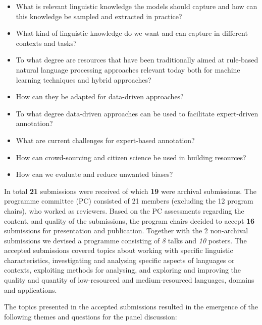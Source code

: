 \begin{itemize}
    \item What is relevant linguistic knowledge the models should capture and how can this knowledge be sampled and extracted in practice?
    \item What kind of linguistic knowledge do we want and can capture in different contexts and tasks?
    \item To what degree are resources that have been traditionally aimed at rule-based natural language processing approaches relevant today both for machine learning techniques and hybrid approaches?
    \item How can they be adapted for data-driven approaches?
    \item To what degree data-driven approaches can be used to facilitate expert-driven annotation?
    \item What are current challenges for expert-based annotation?
    \item How can crowd-sourcing and citizen science be used in building resources?
    \item How can we evaluate and reduce unwanted biases?
\end{itemize}

In total \textbf{21} submissions were received of which \textbf{19} were archival submissions.
The programme committee (PC) consisted of 21 members (excluding the 12 program chairs), who worked as reviewers.
Based on the PC assessments regarding the content, and quality of the submissions, the program chairs decided to accept \textbf{16} submissions for presentation and publication.
Together with the 2 non-archival submissions we devised a programme consisting of \textit{8} talks and \textit{10} posters.
The accepted submissions covered topics about working with specific linguistic characteristics, investigating and analysing specific aspects of languages or contexts, exploiting methods for analysing, and exploring and improving the quality and quantity of low-resourced and medium-resourced languages, domains and applications. 
\vspace{2ex}

The topics presented in the accepted submissions resulted in the emergence of the following themes and questions for the panel discussion:


